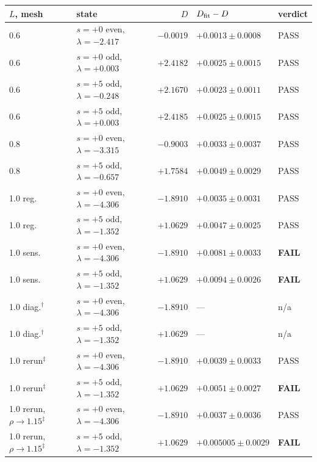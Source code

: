 \begin{tabular}{llrll}
\toprule
$L$, mesh & state & $D$ & $D_{\rm fit}-D$ & verdict \\
\midrule
0.6 & $s=+0$ even, $\lambda=-2.417$ & $-0.0019$ & $+0.0013\pm0.0008$ & PASS \\
0.6 & $s=+0$ odd, $\lambda=+0.003$ & $+2.4182$ & $+0.0025\pm0.0015$ & PASS \\
0.6 & $s=+5$ odd, $\lambda=-0.248$ & $+2.1670$ & $+0.0023\pm0.0011$ & PASS \\
0.6 & $s=+5$ odd, $\lambda=+0.003$ & $+2.4185$ & $+0.0025\pm0.0015$ & PASS \\
0.8 & $s=+0$ even, $\lambda=-3.315$ & $-0.9003$ & $+0.0033\pm0.0037$ & PASS \\
0.8 & $s=+5$ odd, $\lambda=-0.657$ & $+1.7584$ & $+0.0049\pm0.0029$ & PASS \\
1.0 reg. & $s=+0$ even, $\lambda=-4.306$ & $-1.8910$ & $+0.0035\pm0.0031$ & PASS \\
1.0 reg. & $s=+5$ odd, $\lambda=-1.352$ & $+1.0629$ & $+0.0047\pm0.0025$ & PASS \\
1.0 sens. & $s=+0$ even, $\lambda=-4.306$ & $-1.8910$ & $+0.0081\pm0.0033$ & \textbf{FAIL} \\
1.0 sens. & $s=+5$ odd, $\lambda=-1.352$ & $+1.0629$ & $+0.0094\pm0.0026$ & \textbf{FAIL} \\
1.0 diag.$^\dagger$ & $s=+0$ even, $\lambda=-4.306$ & $-1.8910$ & --- & n/a \\
1.0 diag.$^\dagger$ & $s=+5$ odd, $\lambda=-1.352$ & $+1.0629$ & --- & n/a \\
1.0 rerun$^\ddagger$ & $s=+0$ even, $\lambda=-4.306$ & $-1.8910$ & $+0.0039\pm0.0033$ & PASS \\
1.0 rerun$^\ddagger$ & $s=+5$ odd, $\lambda=-1.352$ & $+1.0629$ & $+0.0051\pm0.0027$ & \textbf{FAIL} \\
1.0 rerun, $\rho\to1.15^\ddagger$ & $s=+0$ even, $\lambda=-4.306$ & $-1.8910$ & $+0.0037\pm0.0036$ & PASS \\
1.0 rerun, $\rho\to1.15^\ddagger$ & $s=+5$ odd, $\lambda=-1.352$ & $+1.0629$ & $+0.005005\pm0.0029$ & \textbf{FAIL} \\
\bottomrule
\end{tabular}
